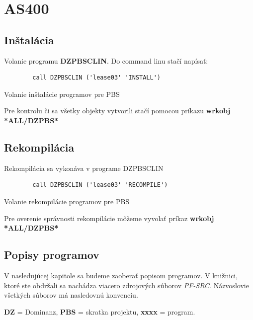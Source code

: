 \chapter{AS400}
\section{Inštalácia}
Volanie programu \textbf{DZPBSCLIN}. Do command linu stačí napísať:

\begin{listing}[!ht]
    \begin{center}
    \begin{verbatim}
        call DZPBSCLIN ('lease03' 'INSTALL')
    \end{verbatim}
\end{center}    
\caption{Volanie inštalácie programov pre \acs{PBS}}
\end{listing}
\label{sec:Install}

Pre kontrolu či sa všetky objekty vytvorili stačí pomocou príkazu \textbf{wrkobj *ALL/DZPBS*}

\section{Rekompilácia}
Rekompilácia sa vykonáva v programe DZPBSCLIN 
\begin{listing}[!ht]
    \begin{center}
    \begin{verbatim}
        call DZPBSCLIN ('lease03' 'RECOMPILE')
    \end{verbatim}
\end{center}    
\caption{Volanie rekompilácie programov pre \acs{PBS}}
\end{listing}
\label{sec:recompl}

Pre overenie správnosti rekompilácie môžeme vyvolať príkaz \textbf{wrkobj *ALL/DZPBS*}




\section{Popisy programov}

V nasledujúcej kapitole sa budeme zaoberať popisom programov. V knižnici, ktoré ste obdržali sa nachádza viacero zdrojových súborov \textit{PF-SRC}. Názvoslovie všetkých súborov má nasledovnú konvenciu. 
\begin{center}
    \textbf{\acs{DZ}} = Dominanz, 
    \textbf{\acs{PBS}} = skratka projektu, 
    \textbf{xxxx} = program.    
\end{center}

